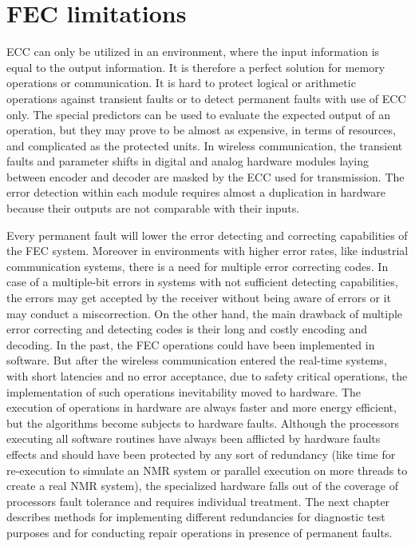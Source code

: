 \section{FEC limitations}\label{sub:limits}
ECC can only be utilized in an environment, where the input information is equal to the output information. It is therefore a perfect solution for memory operations or communication. It is hard to protect logical or arithmetic operations against transient faults or to detect permanent faults with use of ECC only. The special predictors can be used to evaluate the expected output of an operation, but they may prove to be almost as expensive, in terms of resources, and complicated as the protected units. In wireless communication, the transient faults and parameter shifts in digital and analog hardware modules laying between encoder and decoder are masked by the ECC used for transmission. The error detection within each module requires almost a duplication in hardware because their outputs are not comparable with their inputs.

Every permanent fault will lower the error detecting and correcting capabilities of the FEC system. Moreover in environments with higher error rates, like industrial communication systems, there is a need for multiple error correcting codes. In case of a multiple-bit errors in systems with not sufficient detecting capabilities, the errors may get accepted by the receiver without being aware of errors or it may conduct a miscorrection. On the other hand, the main drawback of multiple error correcting and detecting codes is their long and costly encoding and decoding. In the past, the FEC operations could have been implemented in software. But after the wireless communication entered the real-time systems, with short latencies and no error acceptance, due to safety critical operations, the implementation of such operations inevitability moved to hardware. The execution of operations in hardware are always faster and more energy efficient, but the algorithms become subjects to hardware faults. Although the processors executing all software routines have always been afflicted by hardware faults effects and should have been protected by any sort of redundancy (like time for re-execution to simulate an NMR system or parallel execution on more threads to create a real NMR system), the specialized hardware falls out of the coverage of processors fault tolerance and requires individual treatment. The next chapter describes methods for implementing different redundancies for diagnostic test purposes and for conducting repair operations in presence of permanent faults.

